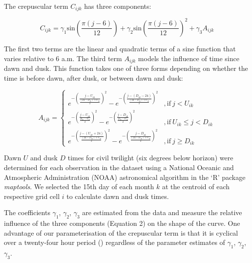 \noindent The crepuscular term $C_{ijk}$ has three components:

\begin{equation} \label{eq:52}
C_{ijk} = \gamma_1\text{sin}\left(\frac{\pi(j-6)}{12}\right) + \gamma_2\text{sin}\left(\frac{\pi(j-6)}{12}\right)^2 + \gamma_3 A_{ijk}
\end{equation}

The first two terms are the linear and quadratic terms of a sine function that varies relative to 6 a.m. The third term $A_{ijk}$ models the influence of time since dawn and dusk. This function takes one of three forms depending on whether the time is before dawn, after dusk, or between dawn and dusk:

\begin{equation} \label{eq:53}
A_{ijk}=
 \begin{cases}
 
e^{ - \left( \frac{j-U_{ik}}{\frac{(24-D_{ik})+U_{ik}}{2}}\right)^2} - e^{ - \left( \frac{j-(D_{ik}-24)}{ \frac{(24-D_{ik})+U_{ik}}{2} } \right)^2} & , \text{if}\ j < U_{ik}\\[.2cm]

e^{ - \left( \frac{j-U_{ik}}{\frac{D_{ik}-U_{ik}}{2}}\right)^2} - e^{ - \left( \frac{j-D_{ik}}{ \frac{D_{ik}-U_{ik}}{2} } \right)^2} & , \text{if}\ U_{ik} \leq j < D_{ik}\\[.2cm]

e^{ - \left( \frac{j-(U_{ik}+24)}{\frac{(24-D_{ik})+U_{ik}}{2}}\right)^2} - e^{ - \left( \frac{j-D_{ik}}{ \frac{(24-D_{ik})+U_{ik}}{2} } \right)^2} & , \text{if}\ j \geq D_{ik}

 \end{cases}
\end{equation}

Dawn $U$ and dusk $D$ times for civil twilight (six degrees below horizon) were determined for each observation in the dataset using a National Oceanic and Atmospheric Administration (NOAA) astronomical algorithm in the `R' package \textit{maptools}. We selected the 15th day of each month $k$ at the centroid of each respective grid cell $i$ to calculate dawn and dusk times.

The coefficients $\gamma_1$, $\gamma_2$, $\gamma_3$ are estimated from the data and measure the relative influence of the three components (Equation 2) on the shape of the curve. One advantage of our parameterisation of the crepuscular term is that it is cyclical over a twenty-four hour period () regardless of the parameter estimates of $\gamma_1$, $\gamma_2$, $\gamma_3$.

